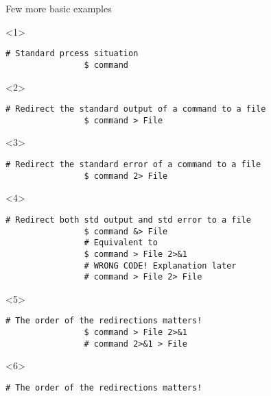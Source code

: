 \begin{frame}[fragile]{Few more basic examples}
    \begin{overlayarea}{\textwidth}{0.2\textheight}
        \begin{onlyenv}<1>
            \begin{lstlisting}[style=MyBash, numbers=none]
                # Standard prcess situation
                $ command
            \end{lstlisting}
        \end{onlyenv}
        \begin{onlyenv}<2>
            \begin{lstlisting}[style=MyBash, numbers=none]
                # Redirect the standard output of a command to a file
                $ command > File
            \end{lstlisting}
        \end{onlyenv}
        \begin{onlyenv}<3>
            \begin{lstlisting}[style=MyBash, numbers=none]
                # Redirect the standard error of a command to a file
                $ command 2> File
            \end{lstlisting}
        \end{onlyenv}
        \begin{onlyenv}<4>
            \begin{lstlisting}[style=MyBash, numbers=none]
                # Redirect both std output and std error to a file
                $ command &> File
                # Equivalent to
                $ command > File 2>&1
                # WRONG CODE! Explanation later
                # command > File 2> File 
            \end{lstlisting}
        \end{onlyenv}
        \begin{onlyenv}<5>
            \begin{lstlisting}[style=MyBash, numbers=none]
                # The order of the redirections matters!
                $ command > File 2>&1
                # command 2>&1 > File
            \end{lstlisting}
        \end{onlyenv}
        \begin{onlyenv}<6>
            \begin{lstlisting}[style=MyBash, numbers=none]
                # The order of the redirections matters!

\end{lstlisting}
\end{onlyenv}
\end{overlayarea}
\end{frame}
